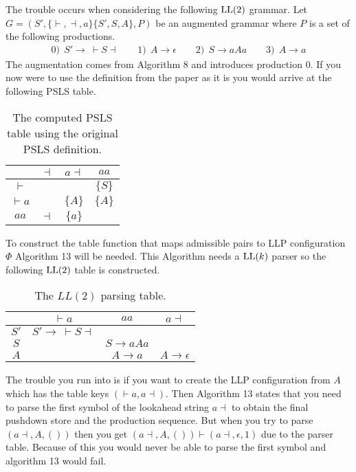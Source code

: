 The trouble occurs when considering the following $\text{LL}(2)$ grammar.
Let $G = (S', \{\vdash, \dashv, a\} \{S', S, A\}, P)$ be an augmented grammar where $P$ is a set of the following productions. 
\begin{align*}
    0)\:\: S' \to \: \vdash S \dashv \qquad 1)\:\: A \to \epsilon \qquad 2)\:\: S \to aAa \qquad 3)\:\: A \to a
\end{align*}
The augmentation comes from Algorithm 8 and introduces production 0. If you now were to use the definition from the paper as it is you would arrive at the following PSLS table.
\begin{table}[H]
    \centering
    \begin{tabular}{c|c|c|c}
        & $\dashv$ & $a\dashv$ & $aa$ \\ \hline
        $\vdash$ & & & $\{S\}$ \\\hline
        $\vdash a$ & & $\{A\}$ & $\{A\}$ \\\hline
        $aa$ & $\dashv$ & $\{a\}$ & 
    \end{tabular}
    \caption{The computed PSLS table using the original PSLS definition.}
\end{table}
\noindent To construct the table function that maps admissible pairs to LLP configuration $\Phi$ Algorithm 13 will be needed. This Algorithm needs a $\text{LL}(k)$ parser so the following $\text{LL}(2)$ table is constructed.
\begin{table}[H]
    \centering
    \begin{tabular}{c|c|c|c}
        & $\vdash a$ & $aa$ & $a\dashv$ \\ \hline
        $S'$ & $S' \to \: \vdash S \dashv$ & & \\\hline
        $S$ & & $S \to aAa$ & \\\hline
        $A$ & & $A \to a$ & $A \to \epsilon$
    \end{tabular}
    \caption{The $LL(2)$ parsing table.}
\end{table}
\noindent The trouble you run into is if you want to create the LLP configuration from $A$ which has the table keys $(\vdash a,a \dashv)$. Then Algorithm 13 states that you need to parse the first symbol of the lookahead string $a \dashv$ to obtain the final pushdown store and the production sequence. But when you try to parse $(a \dashv, A, ())$ then you get $(a \dashv, A, ()) \vdash (a \dashv, \epsilon, 1)$ due to the parser table. Because of this you would never be able to parse the first symbol and algorithm 13 would fail.

